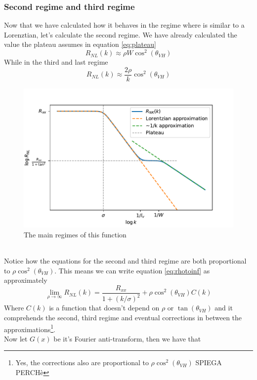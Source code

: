 \subsubsection*{Second regime and third regime}
Now that we have calculated how it behaves in the regime where is similar to a Lorenztian, let's calculate the second regime. We have already calculated the value the plateau assumes in equation \ref{eq:plateau} 
\begin{equation}
    R_{NL}(k)\approx \rho W\cos^2(\theta_{VH})
    \label{eq:second_regime}
\end{equation}
While in the third and last regime 
\begin{equation}
    R_{NL}(k)\approx \frac{2\rho}k \cos^2(\theta_{VH})
    \label{eq:third_regime}
\end{equation}
\begin{figure}[h!]
    \centering
    \includegraphics[width=\linewidth]{Immagini/rnl/rho3.pdf}
    \caption{The main regimes of this function}
    \label{fig:rho3}
\end{figure}\\
Notice how the equations for the second and third regime are both proportional to $\rho\cos^2(\theta_{VH})$. This means we can write equation \ref{eq:rhotoinf} as approximately
\begin{equation}
    \lim_{\rho\to\infty} R_{NL}(k)=\frac{R_{xx}}{1+(k/\sigma)^2} + \rho\cos^2(\theta_{VH}) C(k)
    \label{eq:rhotoinf2}
\end{equation}
Where $C(k)$ is a function that doesn't depend on $\rho$ or $\tan(\theta_{VH})$ and it comprehends the second, third regime and eventual corrections in between the approximations\footnote{Yes, the corrections also are proportional to $\rho\cos^2(\theta_{VH})$ SPIEGA PERCHè}.\\
Now let $G(x)$ be it's Fourier anti-transform, then we have that 

